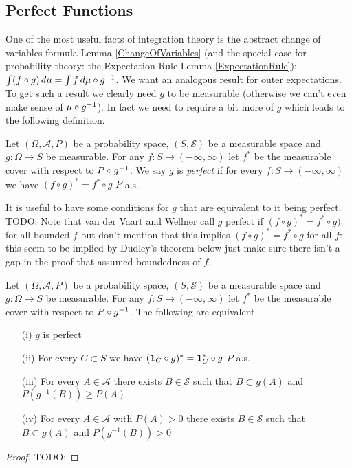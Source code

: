 \subsection{Perfect Functions}

One of the most useful facts of integration theory is the abstract change of variables formula Lemma \ref{ChangeOfVariables} (and the special case for probability theory: the Expectation Rule Lemma \ref{ExpectationRule}): $\int (f \circ g) \, d\mu = \int f \, d\pushforward{g}{\mu}$.  We want an analogous result for outer expectations.  To get such a result we clearly need $g$ to be measurable (otherwise we can't even make sense of $\pushforward{g}{\mu}$).  In fact we need to require a bit more of $g$ which leads to the following definition.

\begin{defn}Let $(\Omega, \mathcal{A}, P)$ be a probability space, $(S, \mathcal{S})$ be a measurable space and $g : \Omega \to S$ be measurable.  For any $f : S \to (-\infty, \infty)$ let $f^*$ be the measurable cover with respect to $\pushforward{g}{P}$.  We say $g$ is \emph{perfect} if for every $f : S \to (-\infty, \infty)$ we have $(f \circ g)^* = f^* \circ g$ $P$-a.s.
\end{defn}

It is useful to have some conditions for $g$ that are equivalent to it being perfect.  TODO: Note that van der Vaart and Wellner call $g$ perfect if $(f \circ g)^* = f^* \circ g)$ for all bounded $f$ but don't mention that this implies $(f \circ g)^* = f^* \circ g$ for all $f$: this seem to be implied by Dudley's theorem below just make sure there isn't a gap in the proof that assumed boundedness of $f$.
\begin{thm}\label{PerfectFunctions}Let $(\Omega, \mathcal{A}, P)$ be a probability space, $(S, \mathcal{S})$ be a measurable space and $g : \Omega \to S$ be measurable.  For any $f : S \to (-\infty, \infty)$ let $f^*$ be the measurable cover with respect to $\pushforward{g}{P}$.  The following are equivalent
\begin{itemize}
\item[(i)] $g$ is perfect
\item[(ii)] For every $C \subset S$ we have $(\characteristic{C} \circ g)^* = \characteristic{C}^* \circ g$ $P$-a.s.
\item[(iii)] For every $A \in \mathcal{A}$ there exists $B \in \mathcal{S}$ such that $B \subset g(A)$ and $P(g^{-1}(B)) \geq P(A)$
\item[(iv)] For every $A \in \mathcal{A}$ with $P(A) > 0$ there exists $B \in \mathcal{S}$ such that $B \subset g(A)$ and $P(g^{-1}(B)) > 0$
\end{itemize}
\end{thm}
\begin{proof}
TODO:
\end{proof}

